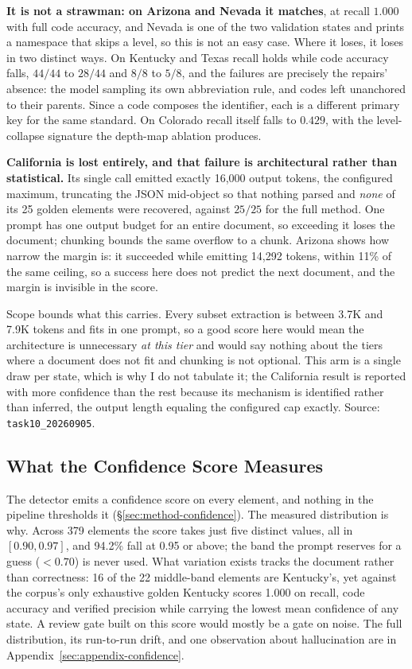 \textbf{It is not a strawman: on Arizona and Nevada it matches}, at recall
$1.000$ with full code accuracy, and Nevada is one of the two validation states
and prints a namespace that skips a level, so this is not an easy case. Where it
loses, it loses in two distinct ways. On Kentucky and Texas recall holds while
code accuracy falls, $44/44$ to $28/44$ and $8/8$ to $5/8$, and the failures are
precisely the repairs' absence: the model sampling its own abbreviation rule,
and codes left unanchored to their parents. Since a code composes the
identifier, each is a different primary key for the same standard. On Colorado
recall itself falls to $0.429$, with the level-collapse signature the depth-map
ablation produces.

\textbf{California is lost entirely, and that failure is architectural rather
than statistical.} Its single call emitted exactly 16{,}000 output tokens, the
configured maximum, truncating the JSON mid-object so that nothing parsed
and \emph{none} of its 25 golden elements were recovered, against $25/25$ for
the full method. One prompt has one output budget for an entire document, so
exceeding it loses the document; chunking bounds the same overflow to a chunk.
Arizona shows how narrow the margin is: it succeeded while emitting 14{,}292
tokens, within 11\% of the same ceiling, so a success here does not predict the
next document, and the margin is invisible in the score.

Scope bounds what this carries. Every subset extraction is between 3.7K and 7.9K
tokens and fits in one prompt, so a good score here would mean the architecture
is unnecessary \emph{at this tier} and would say nothing about the tiers where a
document does not fit and chunking is not optional. This arm is a single draw
per state, which is why I do not tabulate it; the California result is reported
with more confidence than the rest because its mechanism is identified rather
than inferred, the output length equaling the configured cap exactly. Source:
\texttt{task10\_20260905}.

\subsection{What the Confidence Score Measures}
\label{sec:experiments-confidence}

The detector emits a confidence score on every element, and nothing in the
pipeline thresholds it (\S\ref{sec:method-confidence}). The measured
distribution is why. Across 379 elements the score takes just five distinct
values, all in $[0.90, 0.97]$, and 94.2\% fall at 0.95 or above; the band the
prompt reserves for a guess ($<0.70$) is never used. What variation exists
tracks the document rather than correctness: 16 of the 22 middle-band elements
are Kentucky's, yet against the corpus's only exhaustive golden Kentucky scores
1.000 on recall, code accuracy and verified precision while carrying the lowest
mean confidence of any state. A review gate built on this score would mostly be
a gate on noise. The full distribution, its run-to-run drift, and one
observation about hallucination are in Appendix~\ref{sec:appendix-confidence}.

